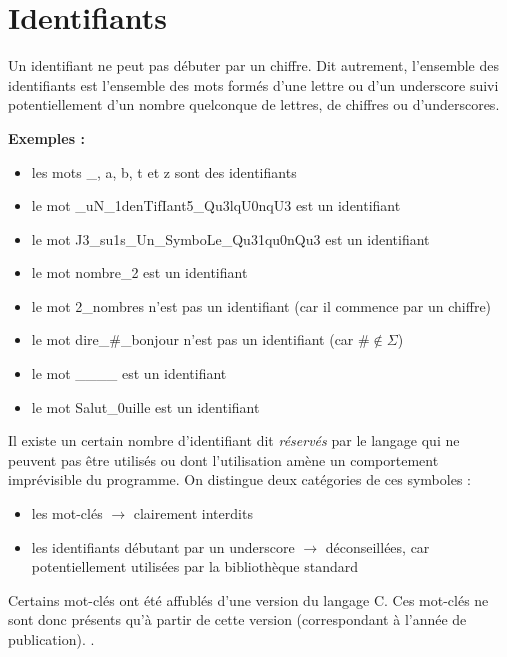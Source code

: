 \documentclass[../../../main.tex]{subfiles}
\begin{document}
\section{Identifiants}\label{sec:identifiants}
 
Un identifiant ne peut pas débuter par un chiffre.
Dit autrement, l'ensemble des identifiants est l'ensemble des mots formés d'une lettre ou d'un underscore suivi potentiellement d'un nombre quelconque de lettres, de chiffres ou d'underscores.
 
\textbf{Exemples :}
\begin{itemize}
	\item les mots \textsf{\_}, \textsf{a}, \textsf{b}, \textsf{t} et \textsf{z} sont des identifiants
	\item le mot \textsf{\_uN\_1denTifIant5\_Qu3lqU0nqU3} est un identifiant
	\item le mot \textsf{J3\_su1s\_Un\_SymboLe\_Qu31qu0nQu3} est un identifiant
	\item le mot \textsf{nombre\_2} est un identifiant
	\item le mot \textsf{2\_nombres} n'est pas un identifiant (car il commence par un chiffre)
	\item le mot \textsf{dire\_\#\_bonjour} n'est pas un identifiant (car $\#\notin{\Sigma}$)
	\item le mot \textsf{\_\_\_\_} est un identifiant
	\item le mot \textsf{Salut\_0uille} est un identifiant
\end{itemize}
Il existe un certain nombre d'identifiant dit \textit{réservés} par le langage qui ne peuvent pas être utilisés ou dont l'utilisation amène un comportement imprévisible du programme. On distingue deux catégories de ces symboles :
\begin{itemize}
	\item les mot-clés $\rightarrow$ clairement interdits
	\item les identifiants débutant par un underscore $\rightarrow$ déconseillées, car potentiellement utilisées par la bibliothèque standard
\end{itemize}
Certains mot-clés ont été affublés d'une version du langage C. Ces mot-clés ne sont donc présents qu'à partir de cette version (correspondant à l'année de publication). .
 
\end{document}
